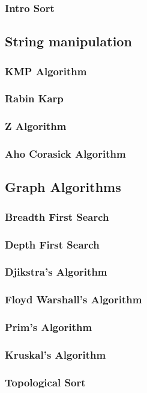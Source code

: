 \documentclass[10pt,landscape,twocolumn]{article}
\begin{document}
\subsubsection{Intro Sort}
\subsection{String manipulation}
\subsubsection{KMP Algorithm}
\subsubsection{Rabin Karp}
\subsubsection{Z Algorithm}
\subsubsection{Aho Corasick Algorithm}

\subsection{Graph Algorithms}
\subsubsection{Breadth First Search}
\subsubsection{Depth First Search}
\subsubsection{Djikstra's Algorithm}
\subsubsection{Floyd Warshall's Algorithm}
\subsubsection{Prim's Algorithm}
\subsubsection{Kruskal's Algorithm}
\subsubsection{Topological Sort}
\end{document}
